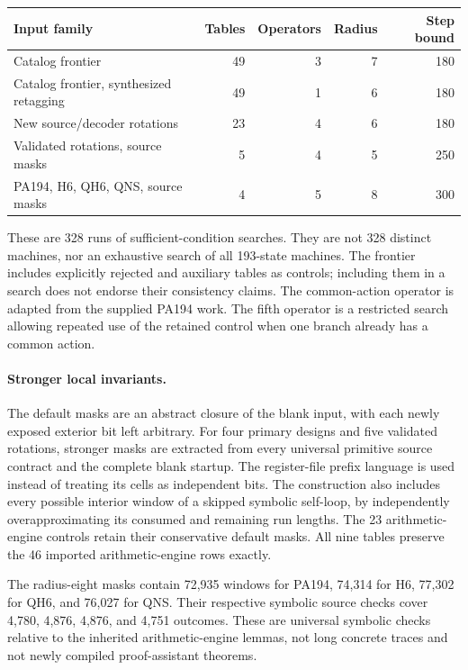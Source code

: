 \begin{center}
\begin{tabular}{lrrrr}
\hline
Input family & Tables & Operators & Radius & Step bound\\
\hline
Catalog frontier & 49 & 3 & 7 & 180\\
Catalog frontier, synthesized retagging & 49 & 1 & 6 & 180\\
New source/decoder rotations & 23 & 4 & 6 & 180\\
Validated rotations, source masks & 5 & 4 & 5 & 250\\
PA194, H6, QH6, QNS, source masks & 4 & 5 & 8 & 300\\
\hline
\end{tabular}
\end{center}
These are 328 runs of sufficient-condition searches. They are not 328
distinct machines, nor an exhaustive search of all 193-state machines.
The frontier includes explicitly rejected and auxiliary tables as controls;
including them in a search does not endorse their consistency claims.
The common-action operator is adapted from the supplied PA194 work.
The fifth operator is a restricted search allowing repeated use of the
retained control when one branch already has a common action.

\paragraph{Stronger local invariants.}
The default masks are an abstract closure of the blank input, with each
newly exposed exterior bit left arbitrary. For four primary designs and
five validated rotations, stronger masks are extracted from every
universal primitive source contract and the complete blank startup.
The register-file prefix language is used instead of treating its cells as
independent bits. The construction also includes every possible interior
window of a skipped symbolic self-loop, by independently overapproximating
its consumed and remaining run lengths. The 23 arithmetic-engine controls
retain their conservative default masks. All nine tables preserve the
46 imported arithmetic-engine rows exactly.

The radius-eight masks contain 72,935 windows for PA194, 74,314 for H6,
77,302 for QH6, and 76,027 for QNS. Their respective symbolic source checks
cover 4,780, 4,876, 4,876, and 4,751 outcomes. These are universal symbolic
checks relative to the inherited arithmetic-engine lemmas, not long
concrete traces and not newly compiled proof-assistant theorems.

